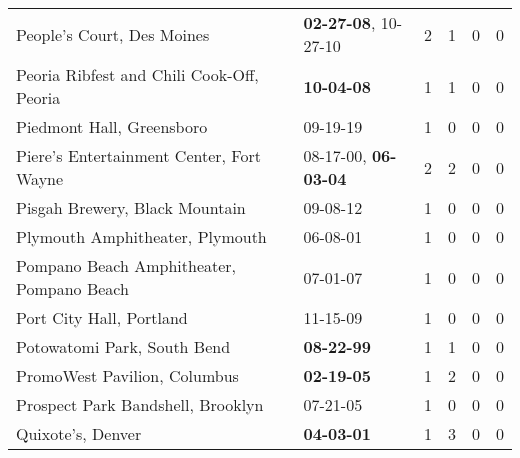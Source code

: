 \begin{longtable}{p{}p{}p{}p{}p{}p{}}
                                                   People's Court, Des Moines &           \textbf{02-27-08\textsuperscript{}}, 10-27-10\textsuperscript{} &  2 &  1 &  0 &  0 \\
                                    Peoria Ribfest and Chili Cook-Off, Peoria &                                       \textbf{10-04-08\textsuperscript{}} &  1 &  1 &  0 &  0 \\
                                                    Piedmont Hall, Greensboro &                                                09-19-19\textsuperscript{} &  1 &  0 &  0 &  0 \\
                                     Piere's Entertainment Center, Fort Wayne &           08-17-00\textsuperscript{}, \textbf{06-03-04\textsuperscript{}} &  2 &  2 &  0 &  0 \\
                                               Pisgah Brewery, Black Mountain &                                                09-08-12\textsuperscript{} &  1 &  0 &  0 &  0 \\
                                              Plymouth Amphitheater, Plymouth &                                                06-08-01\textsuperscript{} &  1 &  0 &  0 &  0 \\
                                    Pompano Beach Amphitheater, Pompano Beach &                                                07-01-07\textsuperscript{} &  1 &  0 &  0 &  0 \\
                                                     Port City Hall, Portland &                                                11-15-09\textsuperscript{} &  1 &  0 &  0 &  0 \\
                                                  Potowatomi Park, South Bend &                                       \textbf{08-22-99\textsuperscript{}} &  1 &  1 &  0 &  0 \\
                                                 PromoWest Pavilion, Columbus &                                       \textbf{02-19-05\textsuperscript{}} &  1 &  2 &  0 &  0 \\
                                            Prospect Park Bandshell, Brooklyn &                                                07-21-05\textsuperscript{} &  1 &  0 &  0 &  0 \\
                                                            Quixote's, Denver &                                       \textbf{04-03-01\textsuperscript{}} &  1 &  3 &  0 &  0 \\

\end{longtable}
